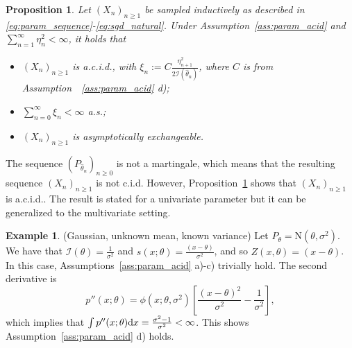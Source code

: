 \documentclass{article}
\newtheorem{proposition}{Proposition}
\theoremstyle{definition}
\newtheorem{example}{Example}
\newcommand{\di}{{\rm d}}
\renewcommand{\&}{and}
\begin{document}
\begin{proposition}\label{prop:param_boot}Let $(X_n)_{n \geq 1}$ be sampled inductively as described in \eqref{eq:param_sequence}-\eqref{eq:sgd_natural}. Under Assumption~\ref{ass:param_acid} and $\sum_{n=1}^{\infty} \eta^2_n<\infty$, it holds that
\begin{itemize}
    \item \hspace{0.2cm} $(X_n)_{n \geq 1}$ is a.c.i.d., with $\xi_{n}:=C \frac{\eta_{n+1}^2}{2\mathcal{I}(\hat{\theta}_n)}$, where $C$ is from Assumption~~\ref{ass:param_acid} d);
    \item \hspace{0.2cm} $\sum_{n=0}^{\infty} \xi_n <\infty$ a.s.;
    \item \hspace{0.2cm} $(X_n)_{n \geq 1}$ is  asymptotically exchangeable.
\end{itemize} 
\end{proposition}

The sequence $(P_{\hat{\theta}_{n}})_{n \geq 0}$ is not a martingale, which means that the resulting sequence $(X_n)_{n \geq 1}$ is not c.i.d. However, Proposition~\ref{prop:param_boot} shows that $(X_n)_{n \geq 1}$ is a.c.i.d.. The result is stated for a univariate parameter but it can be generalized to the multivariate setting. %

\begin{example} (Gaussian, unknown mean, known variance) Let $P_{\theta} = \text{N}(\theta,\sigma^2)$. We have that $\mathcal{I}(\theta)=\frac{1}{\sigma^2}$ and $s(x;\theta) = \frac{(x-\theta)}{\sigma^2}$, and so $Z(x,\theta)=(x-\theta)$. In this case, Assumptions~\ref{ass:param_acid} a)-c) trivially hold. The second derivative is
\[
p''(x;\theta) =\phi(x;\theta,\sigma^2)\left[\frac{(x-\theta)^2}{\sigma^2} - \frac{1}{\sigma^2}\right],
\]
which implies that $\int p''(x;\theta) \di x =\frac{\sigma^{2}-1}{\sigma^{2}}<\infty$. This shows Assumption~\ref{ass:param_acid} d) holds. 
\end{example}


\end{document}
